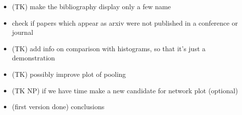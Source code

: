 \documentclass[final,twocolumn,3p,times,authoryear]{elsarticle}
\newcommand{\nati}[1]{{\color[rgb]{.1,.6,.1}{#1}}}
\newcommand{\1}{\b{1}}              %
\newcommand{\0}{\b{0}}              %
\begin{document}
\begin{itemize}[noitemsep,topsep=0pt,parsep=0pt,partopsep=0pt]
    \item (TK) make the bibliography display only a few name
	\item check if papers which appear as arxiv were not published in a conference or journal
    \item (TK) add info on comparison with histograms, so that it's just a demonstration
    \item (TK) possibly improve plot of pooling
    \item (TK NP) if we have time make a new candidate for network plot (optional)
    \item (first version done) conclusions

\end{itemize}
\end{document}
